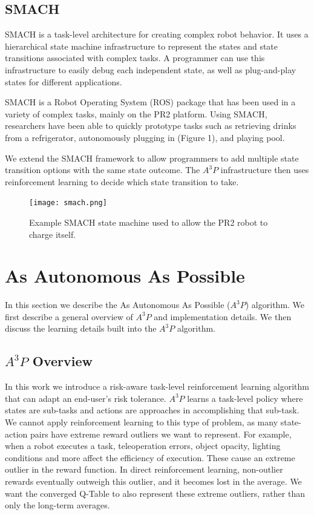 \documentclass[letterpaper, 10 pt, conference]{ieeeconf}  %
\begin{document}
\subsection{SMACH}
SMACH \cite{smach} is a task-level architecture for creating complex robot behavior. It uses a hierarchical state machine infrastructure to represent the states and state transitions associated with complex tasks. A programmer can use this infrastructure to easily debug each independent state, as well as plug-and-play states for different applications.  

SMACH is a Robot Operating System (ROS) \cite{288} package that has been used in a variety of complex tasks, mainly on the PR2 platform. Using SMACH, researchers have been able to quickly prototype tasks such as retrieving drinks from a refrigerator, autonomously plugging in (Figure 1), and playing pool. 

We extend the SMACH framework to allow programmers to add multiple state transition options with the same state outcome. The $A^3P$ infrastructure then uses reinforcement learning to decide which state transition to take.

\begin{figure}
\centering
\texttt{[image: smach.png]}
\caption{Example SMACH state machine used to allow the PR2 robot to charge itself.}
\label{SMACH}
\end{figure}
   
\section{As Autonomous As Possible}
In this section we describe the As Autonomous As Possible ($A^3P$) algorithm. We first describe a general overview of $A^3P$ and implementation details. We then discuss the learning details built into the $A^3P$ algorithm. 

\subsection{$A^3P$ Overview}
In this work we introduce a risk-aware task-level reinforcement learning algorithm that can adapt an end-user's risk tolerance. $A^3P$ learns a task-level policy where states are sub-tasks and actions are approaches in accomplishing that sub-task. We cannot apply reinforcement learning to this type of problem, as many state-action pairs have extreme reward outliers we want to represent. For example, when a robot executes a task, teleoperation errors, object opacity, lighting conditions and more affect the efficiency of execution. These cause an extreme outlier in the reward function. In direct reinforcement learning, non-outlier rewards eventually outweigh this outlier, and it becomes lost in the average. We want the converged Q-Table to also represent these extreme outliers, rather than only the long-term averages.  
\end{document}
